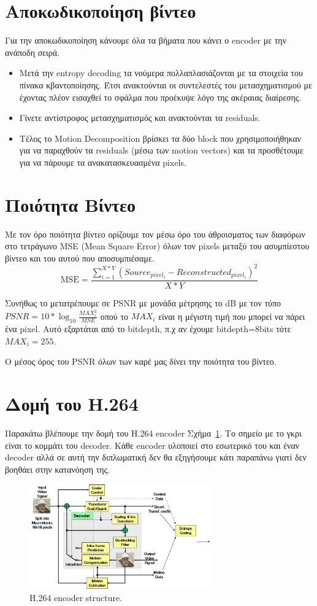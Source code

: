 \section{Αποκωδικοποίηση βίντεο}
\label{section:sect26}

\indent Για την αποκωδικοποίηση κάνουμε όλα τα βήματα που κάνει ο encoder με την ανάποδη σειρά.

\begin{itemize}
  \item Μετά την entropy decoding τα νούμερα πολλαπλασιάζονται με τα στοιχεία του πίνακα κβαντοποίησης. Έτσι ανακτούνται οι συντελεστές του μετασχηματισμού με έχοντας πλέον εισαχθεί το σφάλμα που προέκυψε λόγο της ακέραιας διαίρεσης.
  \item Γίνετε αντίστροφος μετασχηματισμός και ανακτούνται τα residuals.
  \item Τέλος το Motion Decomposition βρίσκει τα δύο block που χρησιμοποιήθηκαν για να παραχθούν τα residuals (μέσω των motion vectors) και τα προσθέτουμε για να πάρουμε τα ανακατασκευασμένα pixels.
\end{itemize}

\section{Ποιότητα Βίντεο}
\label{section:sect27}

\indent Με τον όρο ποιότητα βίντεο ορίζουμε τον μέσω όρο του άθροισματος των διαφόρων στο τετράγωνο MSE (Mean Square Error) όλων τον pixels μεταξύ του ασυμπίεστου βίντεο και του αυτού που αποσυμπιέσαμε. \begin{equation}
\text{MSE} =
\frac{\displaystyle\sum_{i=1}^{X*Y}
(Source_{pixel_i}-Reconstructed_{pixel_i})^{2}}{X*Y}
\end{equation}

\indent Συνήθως το μετατρέπουμε σε PSNR με μονάδα μέτρησης το \si{}{dB} με τον τύπο  $ PSNR = 10*\log_{10}{\frac{MAX_i^2}{MSE}}$ οπού το $MAX_i$ είναι η μέγιστη τιμή που μπορεί να πάρει ένα pixel. Αυτό εξαρτάται από το bitdepth, π.χ αν έχουμε bitdepth=8bits τότε $ MAX_i=255$.

\indent Ο μέσος όρος του PSNR όλων των καρέ μας δίνει την ποιότητα του βίντεο.

\section{Δομή του Η.264}
\label{section:sect28}

\indent Παρακάτω βλέπουμε την δομή του H.264 encoder Σχήμα~\ref{fig:h264}. Το σημείο με το γκρι είναι το κομμάτι του decoder. Κάθε encoder υλοποιεί στο εσωτερικό του και έναν decoder αλλά σε αυτή την διπλωματική δεν θα εξηγήσουμε κάτι παραπάνω γιατί δεν βοηθάει στην κατανόηση της.

\begin{figure}[h]
    \centering
    \includegraphics[width=0.7\textwidth]{chapter2/h264.jpg}
    \caption{H.264 encoder structure. \cite{misc:structure}}
    \label{fig:h264}
\end{figure}
